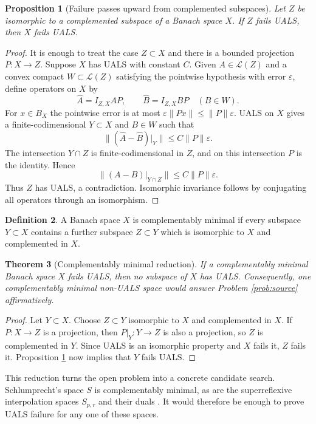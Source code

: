\documentclass[11pt]{article}
\newtheorem{theorem}{Theorem}[section]
\newtheorem{proposition}[theorem]{Proposition}
\theoremstyle{definition}
\newtheorem{definition}[theorem]{Definition}
\theoremstyle{remark}
\newcommand{\LL}{\mathcal{L}}
\begin{document}
\begin{proposition}[Failure passes upward from complemented subspaces]\label{prop:complemented}
Let $Z$ be isomorphic to a complemented subspace of a Banach space $X$.  If $Z$ fails UALS, then $X$ fails UALS.
\end{proposition}

\begin{proof}
It is enough to treat the case $Z\subset X$ and there is a bounded projection $P:X\to Z$.  Suppose $X$ has UALS with constant $C$.  Given $A\in\LL(Z)$ and a convex compact $W\subset\LL(Z)$ satisfying the pointwise hypothesis with error $\varepsilon$, define operators on $X$ by
\[
  \widehat A=I_{Z,X}AP,
  \qquad
  \widehat B=I_{Z,X}BP\quad(B\in W).
\]
For $x\in B_X$ the pointwise error is at most $\varepsilon\|Px\|\leq\|P\|\varepsilon$.  UALS on $X$ gives a finite-codimensional $Y\subset X$ and $B\in W$ such that
\[
  \|(\widehat A-\widehat B)|_Y\|\leq C\|P\|\varepsilon.
\]
The intersection $Y\cap Z$ is finite-codimensional in $Z$, and on this intersection $P$ is the identity.  Hence
\[
  \|(A-B)|_{Y\cap Z}\|\leq C\|P\|\varepsilon.
\]
Thus $Z$ has UALS, a contradiction.  Isomorphic invariance follows by conjugating all operators through an isomorphism.
\end{proof}

\begin{definition}
A Banach space $X$ is complementably minimal if every subspace $Y\subset X$ contains a further subspace $Z\subset Y$ which is isomorphic to $X$ and complemented in $X$.
\end{definition}

\begin{theorem}[Complementably minimal reduction]\label{thm:cm}
If a complementably minimal Banach space $X$ fails UALS, then no subspace of $X$ has UALS.  Consequently, one complementably minimal non-UALS space would answer Problem \ref{prob:source} affirmatively.
\end{theorem}

\begin{proof}
Let $Y\subset X$.  Choose $Z\subset Y$ isomorphic to $X$ and complemented in $X$.  If $P:X\to Z$ is a projection, then $P|_Y:Y\to Z$ is also a projection, so $Z$ is complemented in $Y$.  Since UALS is an isomorphic property and $X$ fails it, $Z$ fails it.  Proposition \ref{prop:complemented} now implies that $Y$ fails UALS.
\end{proof}

This reduction turns the open problem into a concrete candidate search.  Schlumprecht's space $S$ is complementably minimal, as are the superreflexive interpolation spaces $S_{p,r}$ and their duals \cite{Schlumprecht,CKKM}.  It would therefore be enough to prove UALS failure for any one of these spaces.
\end{document}
